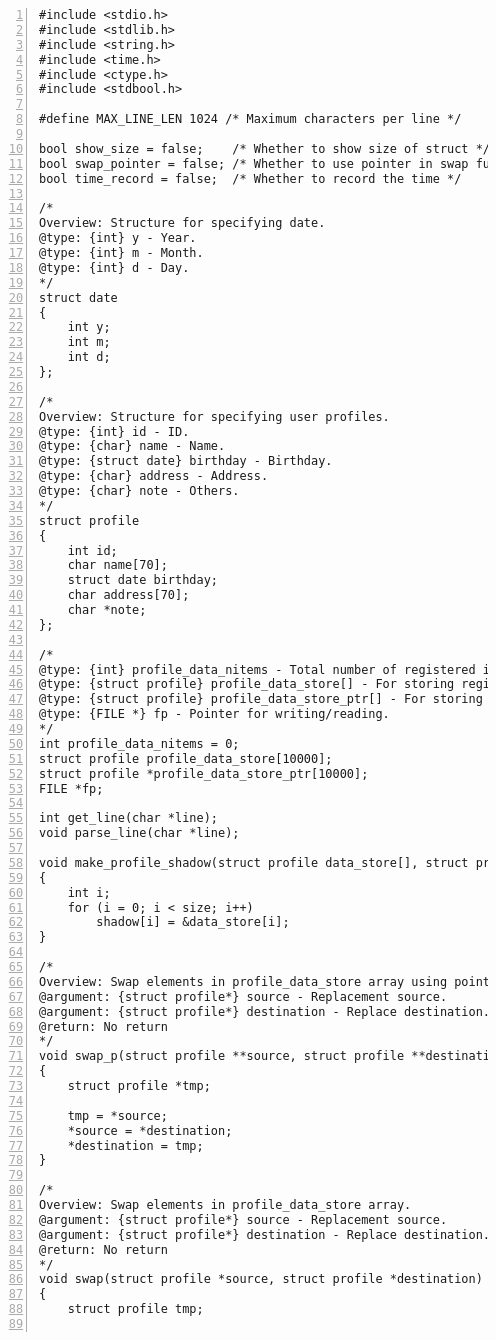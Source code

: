 \documentclass[autodetect-engine,dvi=dvipdfmx,ja=standard,
               a4j,11pt]{bxjsarticle}
\begin{document}
\begin{Verbatim}[numbers=left, xleftmargin=10mm, numbersep=6pt,
    fontsize=\small, baselinestretch=0.8]
#include <stdio.h>
#include <stdlib.h>
#include <string.h>
#include <time.h>
#include <ctype.h>
#include <stdbool.h>

#define MAX_LINE_LEN 1024 /* Maximum characters per line */

bool show_size = false;    /* Whether to show size of struct */
bool swap_pointer = false; /* Whether to use pointer in swap function */
bool time_record = false;  /* Whether to record the time */

/*
Overview: Structure for specifying date.
@type: {int} y - Year.
@type: {int} m - Month.
@type: {int} d - Day.
*/
struct date
{
    int y;
    int m;
    int d;
};

/*
Overview: Structure for specifying user profiles.
@type: {int} id - ID.
@type: {char} name - Name.
@type: {struct date} birthday - Birthday.
@type: {char} address - Address.
@type: {char} note - Others.
*/
struct profile
{
    int id;
    char name[70];
    struct date birthday;
    char address[70];
    char *note;
};

/*
@type: {int} profile_data_nitems - Total number of registered items.
@type: {struct profile} profile_data_store[] - For storing registered data.
@type: {struct profile} profile_data_store_ptr[] - For storing pointer data.
@type: {FILE *} fp - Pointer for writing/reading.
*/
int profile_data_nitems = 0;
struct profile profile_data_store[10000];
struct profile *profile_data_store_ptr[10000];
FILE *fp;

int get_line(char *line);
void parse_line(char *line);

void make_profile_shadow(struct profile data_store[], struct profile *shadow[], int size)
{
    int i;
    for (i = 0; i < size; i++)
        shadow[i] = &data_store[i];
}

/*
Overview: Swap elements in profile_data_store array using pointer.
@argument: {struct profile*} source - Replacement source.
@argument: {struct profile*} destination - Replace destination.
@return: No return
*/
void swap_p(struct profile **source, struct profile **destination)
{
    struct profile *tmp;

    tmp = *source;
    *source = *destination;
    *destination = tmp;
}

/*
Overview: Swap elements in profile_data_store array.
@argument: {struct profile*} source - Replacement source.
@argument: {struct profile*} destination - Replace destination.
@return: No return
*/
void swap(struct profile *source, struct profile *destination)
{
    struct profile tmp;


\end{Verbatim}
\end{document}
